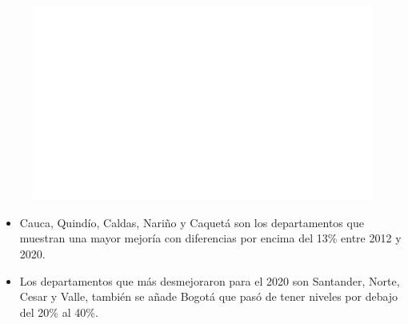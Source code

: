     \begin{figure}[H]
        \caption[Pobreza monetaria por departamentos - Cambio porcentual entre 2012 y 2020 ]{\label{pobreza_monetaria_dptos_cambio} }
        \begin{center}
        \includegraphics[width=\textwidth,keepaspectratio]{img/var_262_map_change.png}
        \end{center}
    \end{figure}
            \begin{itemize}
                    \item Cauca, Quindío, Caldas, Nariño y Caquetá son los departamentos que muestran una mayor mejoría con diferencias por encima del 13\% entre 2012 y 2020.
                    \item Los departamentos que más desmejoraron para el 2020 son Santander, Norte, Cesar y Valle, también se añade Bogotá que pasó de tener niveles por debajo del 20\% al 40\%.
                    \end{itemize}


